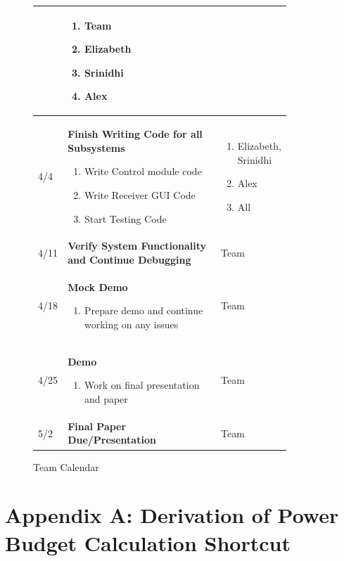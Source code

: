 \documentclass{article}
\begin{document}
\begin{figure}[H]
\begin{center}
\begin{tabular}{|p{0.05 \linewidth}|p{0.6 \linewidth}| p{0.2 \linewidth}| }
		 & \begin{enumerate}
		 	\item Team
		 	\item Elizabeth
	 		\item Srinidhi
	 		\item Alex 
		 \end{enumerate} \\
		 \hline 
		 4/4  & \textbf{Finish Writing Code for all Subsystems
		 } \begin{enumerate}
		 	\item Write Control module code
		 	\item Write Receiver GUI Code
		 	\item Start Testing Code
		 \end{enumerate} 
		 & \begin{enumerate}
		 	\item Elizabeth, Srinidhi
		 	\item Alex
		 	\item All 
		 \end{enumerate} \\
	 	\hline 
	 	4/11  & \textbf{Verify System Functionality and Continue Debugging} 
	 	& Team \\
	 	\hline 
	 	4/18 & \textbf{Mock Demo} \begin{enumerate}
	 		\item Prepare demo and continue working on any issues
	 	\end{enumerate} & Team \\ 
 		\hline 
 		4/25 & \textbf{Demo} \begin{enumerate}
 			\item Work on final presentation and paper
 		\end{enumerate} & Team \\
 		\hline 
 		5/2 & \textbf{Final Paper Due/Presentation} & Team \\ 
 		\hline 
		\end{tabular}
	\end{center}
	\caption{Team Calendar}
\end{figure}



\section{Appendix A: Derivation of Power Budget Calculation Shortcut} \label{ughhhh} 

\paragraph{} 
\end{document}
